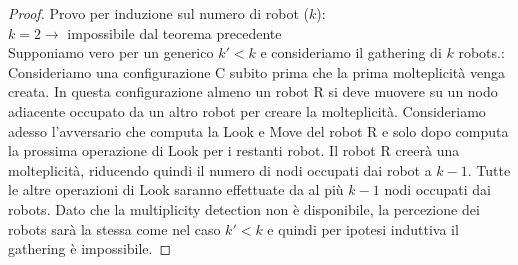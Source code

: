 \begin{proof}
    Provo per induzione sul numero di robot ($k$):\\
    $k = 2 \rightarrow $ impossibile dal teorema precedente\\
    Supponiamo vero per un generico $k'< k$ e consideriamo il gathering di $k$
    robots.:\\
    Consideriamo una configurazione C subito prima che la prima molteplicità
    venga creata. In questa configurazione almeno un robot R si deve muovere su
    un nodo adiacente occupato da un altro robot per creare la molteplicità.
    Consideriamo adesso l'avversario che computa la Look e Move del robot R e
    solo dopo computa la prossima operazione di Look per i restanti robot. Il
    robot R creerà una molteplicità, riducendo quindi il numero di nodi occupati
    dai robot a $k-1$. Tutte le altre operazioni di Look saranno effettuate da
    al più $k-1$ nodi occupati dai robots. Dato che la multiplicity detection
    non è disponibile, la percezione dei robots sarà la stessa come nel caso
    $k'<k$ e quindi per ipotesi induttiva il gathering è impossibile.

\end{proof}

